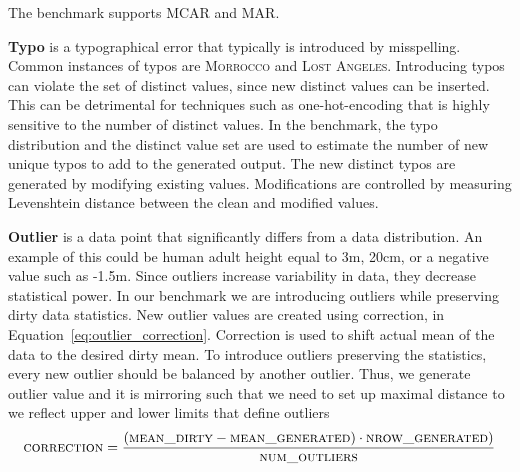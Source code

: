 The benchmark supports MCAR and MAR. 


\textbf{Typo} is a typographical error that typically is introduced by misspelling. 
Common instances of typos are \textsc{Morrocco} and \textsc{Lost Angeles}. 
Introducing typos can violate the set of distinct values, since new distinct values can be inserted.
This can be detrimental for techniques such as one-hot-encoding that is highly sensitive to the number of distinct values.
In the benchmark, the typo distribution and the distinct value set are used to estimate the number of new unique typos to add to the generated output. 
The new distinct typos are generated by modifying existing values. Modifications are controlled by measuring Levenshtein distance between the clean and modified values. 


\textbf{Outlier} is a data point that significantly differs from a data distribution.
An example of this could be human adult height equal to 3m, 20cm, or a negative value such as -1.5m. 
Since outliers increase variability in data, they decrease statistical power.
In our benchmark we are introducing outliers while preserving dirty data statistics. 
New outlier values are created using correction, in Equation~\ref{eq:outlier_correction}. 
Correction is used to shift actual mean of the data to the desired dirty mean. 
To introduce outliers preserving the statistics, every new outlier should be balanced by another outlier. 
Thus, we generate outlier value and it is mirroring such that
we need to set up maximal distance to we reflect upper and lower limits that define outliers  
\begin{equation}
\label{eq:outlier_correction}
\textsc{correction} = \frac{(\textsc{mean\_dirty} - \textsc{mean\_generated}) \cdot \textsc{nrow\_generated})}{\textsc{num\_outliers}}
\end{equation}




